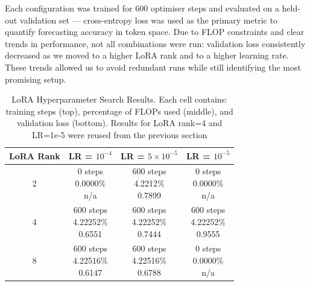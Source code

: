 \documentclass[a4paper,12pt]{article}
\begin{document}
Each configuration was trained for 600 optimiser steps and evaluated on a held-out validation set — cross-entropy loss was used as the primary metric to quantify forecasting accuracy in token space. Due to FLOP constraints and clear trends in performance, not all combinations were run: validation loss consistently decreased as we moved to a higher LoRA rank and to a higher learning rate. These trends allowed us to avoid redundant runs while still identifying the most promising setup.

\vspace{0.2cm}

\begin{table}[H]
  \centering
  \begin{tabular}{|c|c|c|c|}
      \hline
      \textbf{LoRA Rank} & \textbf{LR = $10^{-4}$} & \textbf{LR = $5 \times 10^{-5}$} & \textbf{LR = $10^{-5}$} \\
      \hline
      2 & 
      \makecell{0 steps \\ 0.0000\% \\ n/a} & 
      \makecell{600 steps \\ 4.2212\% \\ 0.7899} & 
      \makecell{0 steps \\ 0.0000\% \\ n/a} \\
      \hline
      4 & 
      \makecell{600 steps \\ 4.22252\% \\ 0.6551} & 
      \makecell{600 steps \\ 4.22252\% \\ 0.7444} & 
      \makecell{600 steps \\ 4.22252\% \\ 0.9555} \\
      \hline
      8 & 
      \makecell{600 steps \\ 4.22516\% \\ 0.6147} & 
      \makecell{600 steps \\ 4.22516\% \\ 0.6788} & 
      \makecell{0 steps \\ 0.0000\% \\ n/a} \\
      \hline
  \end{tabular}
  \vspace{0.2cm}
  \caption{LoRA Hyperparameter Search Results. Each cell contains: training steps (top), percentage of FLOPs used (middle), and validation loss (bottom). Results for LoRA rank=4 and LR=1e-5 were reused from the previous section}
  \label{tab:lora_grid_search}
\end{table}
\end{document}
